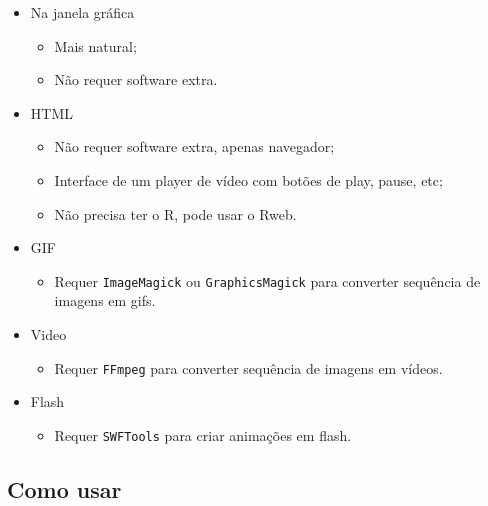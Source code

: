 \begin{frame}
  \begin{itemize}
  \item Na janela gráfica
    \begin{itemize}
    \item Mais natural;
    \item Não requer software extra.
    \end{itemize}
  \item HTML
    \begin{itemize}
    \item Não requer software extra, apenas navegador;
    \item Interface de um player de vídeo com botões de play, pause,
      etc;
    \item Não precisa ter o R, pode usar o Rweb.
    \end{itemize}
  \item GIF
    \begin{itemize}
    \item Requer \texttt{ImageMagick} ou \texttt{GraphicsMagick} para
      converter sequência de imagens em gifs.
    \end{itemize}
  \item Video
    \begin{itemize}
    \item Requer \texttt{FFmpeg} para converter sequência de imagens em
      vídeos.
    \end{itemize}
  \item Flash
    \begin{itemize}
    \item Requer \texttt{SWFTools} para criar animações em flash.
    \end{itemize}
  \end{itemize}
\end{frame}


\subsection{Como usar}

\begin{frame}



\end{frame}


